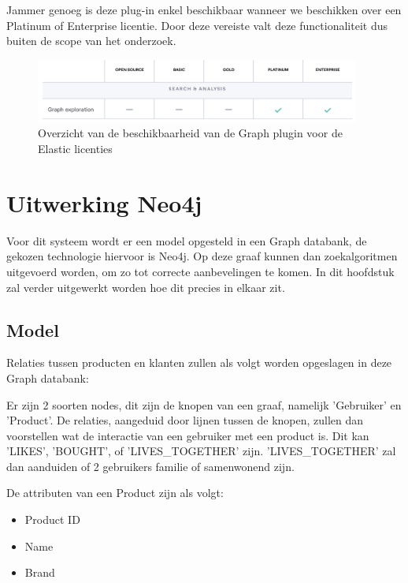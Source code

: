 Jammer genoeg is deze plug-in enkel beschikbaar wanneer we beschikken over een Platinum of Enterprise licentie. Door deze vereiste valt deze functionaliteit dus buiten de scope van het onderzoek. 

\begin{figure} [ht]
	\centering
	\includegraphics[width=0.95\textwidth]{img/elastic-license}
	\caption{Overzicht van de beschikbaarheid van de Graph plugin voor de Elastic licenties}
	\label{fig:elastic licenties overzicht graph}
\end{figure}

\section{Uitwerking Neo4j}
\label{sec:UItwerking Neo4j}

Voor dit systeem wordt er een model opgesteld in een Graph databank, de gekozen technologie hiervoor is Neo4j. Op deze graaf kunnen dan zoekalgoritmen uitgevoerd worden, om zo tot correcte aanbevelingen te komen. In dit hoofdstuk zal verder uitgewerkt worden hoe dit precies in elkaar zit.

\subsection{Model}
\label{sec:Model}
Relaties tussen producten en klanten zullen als volgt worden opgeslagen in deze Graph databank:

Er zijn 2 soorten nodes, dit zijn de knopen van een graaf, namelijk 'Gebruiker' en 'Product'. De relaties, aangeduid door lijnen tussen de knopen, zullen dan voorstellen wat de interactie van een gebruiker met een product is. Dit kan 'LIKES', 'BOUGHT', of 'LIVES\_TOGETHER' zijn. 'LIVES\_TOGETHER' zal dan aanduiden of 2 gebruikers familie of samenwonend zijn. 

De attributen van een Product zijn als volgt:
\begin{itemize}
	\item Product ID
	\item Name
	\item Brand
\end{itemize}

